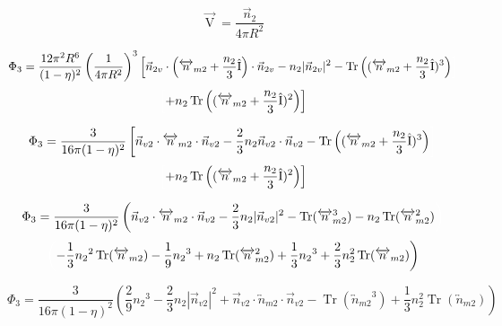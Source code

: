 \documentclass[double,12pt]{beavtex}
\begin{document}
\begin{equation}{\overrightarrow{\operatorname{V}}=\frac{\vec{n}_2}{4\pi{R}^2}}\end{equation}

\begin{displaymath}{\Phi_3=\frac{12\pi^2R^6}{(1-\eta)^2}\left(\frac{1}{4\pi{R}^2}\right)^3\left[\vec{n}_{2v}\cdot\left({\overleftrightarrow{n}_{m2}}+\frac{n_2}{3}\hat{\operatorname{I}}\right)\cdot\vec{n}_{2v}-n_2|\vec{n}_{2v}|^2-\operatorname{Tr}\left(({\overleftrightarrow{n}_{m2}}+\frac{n_2}{3}\hat{\operatorname{I}})^3\right)\color{white}\right]\color{black}}\end{displaymath}
\begin{equation}{\color{white}\left[\color{black}+n_2\operatorname{Tr}\left(({\overleftrightarrow{n}_{m2}}+\frac{n_2}{3}\hat{\operatorname{I}})^2\right)\right]}\end{equation}

\begin{displaymath}{\Phi_3=\frac{3}{16\pi(1-\eta)^2}\left[\vec{n}_{v2}\cdot{\overleftrightarrow{n}_{m2}}\cdot{\vec{n}_{v2}}-\frac{2}{3}n_2\vec{n}_{v2}\cdot\vec{n}_{v2}-\operatorname{Tr}\left(({\overleftrightarrow{n}_{m2}}+\frac{n_2}{3}\hat{\operatorname{I}})^3\right)\color{white}\right]\color{black}}\end{displaymath}\begin{equation}{\color{white}\left[\color{black}+n_2\operatorname{Tr}\left((\overleftrightarrow{n}_{m2}+\frac{n_2}{3}\hat{\operatorname{I}})^2\right)\right]}\end{equation}

\begin{displaymath}{\Phi_3=\frac{3}{16\pi(1-\eta)^2}\left(\vec{n}_{v2}\cdot{\overleftrightarrow{n}_{m2}}\cdot{\vec{n}_{v2}}-\frac{2}{3}n_2|\vec{n}_{v2}|^2-\operatorname{Tr}({\overleftrightarrow{n}_{m2}^3})
-n_2\operatorname{Tr}(\overleftrightarrow{n}_{m2}^2)\color{white}\right)\color{black}}\end{displaymath} \begin{equation}{\color{white}\left(\color{black}-\frac{1}{3}{n_2}^2\operatorname{Tr}(\overleftrightarrow{n}_{m2})-\frac{1}{9}{n_2}^3+n_2\operatorname{Tr}(\overleftrightarrow{n}_{m2}^2)+\frac{1}{3}{n_2}^3+\frac{2}{3}n^2_2\operatorname{Tr}(\overleftrightarrow{n}_{m2})\right)}\end{equation} 

\begin{equation}{\Phi_3=\frac{3}{16\pi(1-\eta)^2}\left(\frac{2}{9}{n_2}^3-\frac{2}{3}n_2|\vec{n}_{v2}|^2+\vec{n}_{v2}\cdot{\overleftrightarrow{n}_{m2}}\cdot{\vec{n}_{v2}}-\operatorname{Tr}({\overleftrightarrow{n}_{m2}}^3)+\frac{1}{3}n^2_2\operatorname{Tr}(\overleftrightarrow{n}_{m2})\right)}\end{equation} 
\end{document}
